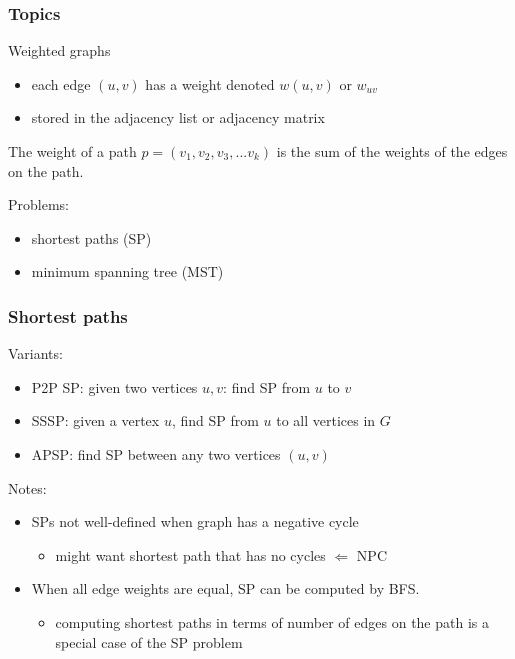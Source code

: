   \begin{frame}[fragile]
  \frametitle{Topics}
  
  Weighted graphs
  \begin{itemize} 
  \item each edge $(u,v)$ has a weight denoted $w(u,v)$ or $w_{uv}$
  \item stored in the adjacency list or adjacency matrix 
  \end{itemize} 
  
 
  The weight of a path $p= (v_1, v_2, v_3, ...v_k)$ is the sum of the weights of the edges on the path.
 
  Problems: 
  \begin{itemize}
  \item shortest paths (SP)
  \item minimum spanning tree (MST)
  \end{itemize}
\end{frame} 




  \begin{frame}[fragile]
  \frametitle{Shortest paths}
  Variants: 
  \begin{itemize} 
  \item P2P SP: given two vertices $u,v$: find SP from $u$ to $v$ 
  \item SSSP: given a vertex $u$, find SP from $u$ to all vertices  in $G$
  \item APSP: find SP between any two vertices $(u,v)$
  \end{itemize} 
  

Notes: 
\begin{itemize} 
\item SPs not well-defined when graph has a negative cycle
  \begin{itemize}
  \item might want shortest path that has no cycles $\Leftarrow$  NPC
  \end{itemize} 
  
\item When all edge weights are equal, SP can be computed by BFS.
  \begin{itemize}
  \item computing shortest paths in terms of number of edges on the path is a special case of the SP problem
  \end{itemize} 
  \end{itemize} 
\end{frame} 





